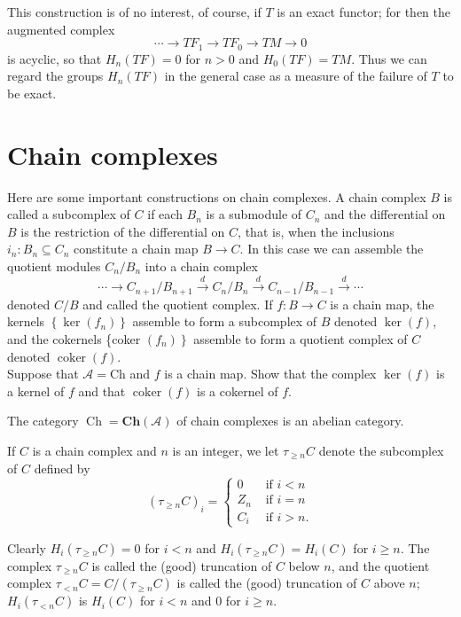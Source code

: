 This construction is of no interest, of course, if $T$ is an exact functor; for then the augmented complex
$$
\cdots \rightarrow T F_1 \rightarrow T F_0 \rightarrow T M \rightarrow 0
$$
is acyclic, so that $H_n(T F)=0$ for $n>0$ and $H_0(T F)=T M$. Thus we can regard the groups $H_n(T F)$ in the general case as a measure of the failure of $T$ to be exact.

\section{Chain complexes}

Here are some important constructions on chain complexes. A chain complex $B$ is called a subcomplex of $C$ if each $B_n$ is a submodule of $C_n$ and the differential on $B$ is the restriction of the differential on $C$, that is, when the inclusions $i_n: B_n \subseteq C_n$ constitute a chain map $B \rightarrow C$. In this case we can assemble the quotient modules $C_n / B_n$ into a chain complex
$$
\cdots \rightarrow C_{n+1} / B_{n+1} \xrightarrow{d} C_n / B_n \xrightarrow{d} C_{n-1} / B_{n-1} \xrightarrow{d} \cdots
$$
denoted $C / B$ and called the quotient complex. If $f: B \rightarrow C$ is a chain map, the kernels $\left\{\operatorname{ker}\left(f_n\right)\right\}$ assemble to form a subcomplex of $B$ denoted $\operatorname{ker}(f)$, and the cokernels \{coker $\left.\left(f_n\right)\right\}$ assemble to form a quotient complex of $C$ denoted $\operatorname{coker}(f)$.\\
Suppose that $\mathcal{A}=\mathrm{Ch}$ and $f$ is a chain map. Show that the complex $\operatorname{ker}(f)$ is a kernel of $f$ and that $\operatorname{coker}(f)$ is a cokernel of $f$.

\begin{theo}
The category $\operatorname{Ch}=\mathbf{C h}(\mathcal{A})$ of chain complexes is an abelian category.   
\end{theo}

If $C$ is a chain complex and $n$ is an integer, we let $\tau_{\geq n} C$ denote the subcomplex of $C$ defined by
$$
\left(\tau_{\geq n} C\right)_i= \begin{cases}0 & \text { if } i<n \\ Z_n & \text { if } i=n \\ C_i & \text { if } i>n .\end{cases}
$$

Clearly $H_i\left(\tau_{\geq n} C\right)=0$ for $i<n$ and $H_i\left(\tau_{\geq n} C\right)=H_i(C)$ for $i \geq n$. The complex $\tau_{\geq n} C$ is called the (good) truncation of $C$ below $n$, and the quotient complex $\tau_{<n} C=C /\left(\tau_{\geq n} C\right)$ is called the (good) truncation of $C$ above $n$; $H_i\left(\tau_{<n} C\right)$ is $H_i(C)$ for $i<n$ and 0 for $i \geq n$.\\

